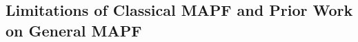 \documentclass[review]{elsarticle}
\newcommand\roni[1]{\nb{\textbf{Roni:}}{green}{#1}}
\begin{document}
\subsection{Limitations of Classical MAPF and Prior Work on General MAPF}
\label{sec:limitations}

\end{document}
